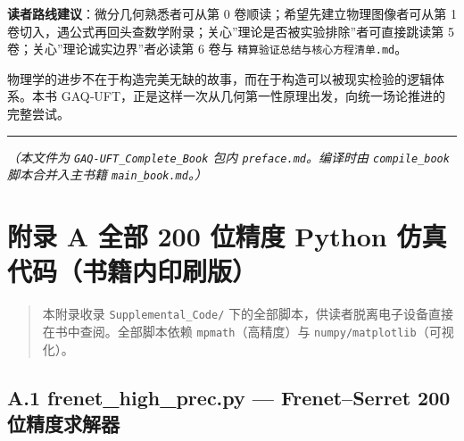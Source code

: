 \textbf{读者路线建议}：微分几何熟悉者可从第 0
卷顺读；希望先建立物理图像者可从第 1
卷切入，遇公式再回头查数学附录；关心''理论是否被实验排除''者可直接跳读第
5 卷；关心''理论诚实边界''者必读第 6 卷与
\texttt{精算验证总结与核心方程清单.md}。

物理学的进步不在于构造完美无缺的故事，而在于构造可以被现实检验的逻辑体系。本书
GAQ‑UFT，正是这样一次从几何第一性原理出发，向统一场论推进的完整尝试。

\begin{center}\rule{0.5\linewidth}{0.5pt}\end{center}

\emph{（本文件为 \texttt{GAQ‑UFT\_Complete\_Book} 包内
\texttt{preface.md}。编译时由 \texttt{compile\_book} 脚本合并入主书籍
\texttt{main\_book.md}。）}

\section{附录 A 全部 200 位精度 Python
仿真代码（书籍内印刷版）}\label{ux9644ux5f55-a-ux5168ux90e8-200-ux4f4dux7cbeux5ea6-python-ux4effux771fux4ee3ux7801ux4e66ux7c4dux5185ux5370ux5237ux7248}

\begin{quote}
本附录收录 \texttt{Supplemental\_Code/}
下的全部脚本，供读者脱离电子设备直接在书中查阅。全部脚本依赖
\texttt{mpmath}（高精度）与 \texttt{numpy/matplotlib}（可视化）。
\end{quote}

\subsection{A.1 frenet\_high\_prec.py --- Frenet--Serret 200
位精度求解器}\label{a.1-frenet_high_prec.py-frenetserret-200-ux4f4dux7cbeux5ea6ux6c42ux89e3ux5668}

